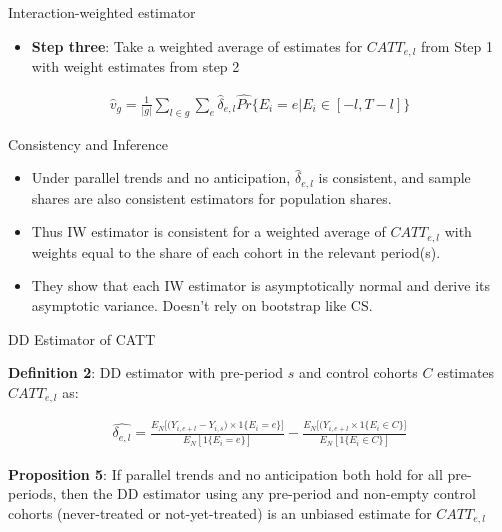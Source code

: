 \documentclass{beamer}
\begin{document}
\begin{frame}{Interaction-weighted estimator}

\begin{itemize}
\item \textbf{Step three}: Take a weighted average of estimates for $CATT_{e,l}$ from Step 1 with weight estimates from step 2
\end{itemize}


\begin{eqnarray*}
\widehat{v}_g = \frac{1}{|g|} \sum_{l \in g} \sum_e \widehat{\delta}_{e,l} \widehat{Pr} \{ E_i=e | E_i \in [-l,T-l]\}
\end{eqnarray*}


\end{frame}

\begin{frame}{Consistency and Inference}


\begin{itemize}
\item Under parallel trends and no anticipation, $\widehat{\delta}_{e,l}$ is consistent, and sample shares are also consistent estimators for population shares. 
\item Thus IW estimator is consistent for a weighted average of $CATT_{e,l}$ with weights equal to the share of each cohort in the relevant period(s).
\item They show that each IW estimator is asymptotically normal and derive its asymptotic variance. Doesn't rely on bootstrap like CS.
\end{itemize}

\end{frame}

\begin{frame}{DD Estimator of CATT}

\textbf{Definition 2}: DD estimator with pre-period $s$ and control cohorts $C$ estimates $CATT_{e,l}$ as:

\begin{eqnarray*}
\widehat{\delta_{e,l}} = \frac{ E_N \big [ \big ( Y_{i, e+l} - Y_{i,s} \big ) \times 1\{E_i=e\} \big ]}{E_N[1 \{E_i=e\} ]} - \frac{E_N \big [ \big ( Y_{i,e+l} \times 1 \{E_i \in C \} ]}{E_N [1 \{ E_i \in C \}]}
\end{eqnarray*}


\textbf{Proposition 5}: If parallel trends and no anticipation both hold for all pre-periods, then the DD estimator using any pre-period and non-empty control cohorts (never-treated or not-yet-treated) is an unbiased estimate for $CATT_{e,l}$

\end{frame}
\end{document}
